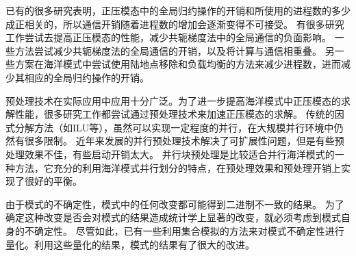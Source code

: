 已有的很多研究表明，正压模态中的全局归约操作的开销和所使用的进程数的多少成正相关的，所以通信开销随着进程数的增加会逐渐变得不可接受。
有很多研究工作尝试去提高正压模态的性能，减少共轭梯度法中的全局通信的负面影响。
一些方法尝试减少共轭梯度法的全局通信的开销，以及将计算与通信相重叠。 
另一些方案在海洋模式中尝试使用陆地点移除和负载均衡的方法来减少进程数，进而减少其相应的全局归约操作的开销。 

预处理技术在实际应用中应用十分广泛。为了进一步提高海洋模式中正压模态的求解性能，很多研究工作都尝试通过预处理技术来加速正压模态的求解。 
传统的因式分解方法（如ILU等），虽然可以实现一定程度的并行，在大规模并行环境中仍然有很多限制。
近年来发展的并行预处理技术解决了可扩展性问题，但是有些预处理效果不佳，有些启动开销太大。 
并行块预处理是比较适合并行海洋模式的一种方法，它充分的利用海洋模式并行划分的特点，在预处理效果和预处理开销上实现了很好的平衡。

由于模式的不确定性，模式中的任何改变都可能得到二进制不一致的结果。
为了确定这种改变是否会对模式的结果造成统计学上显著的改变，就必须考虑到模式自身的不确定性。
尽管如此，已有一些利用集合模拟的方法来对模式不确定性进行量化。利用这些量化的结果，模式的结果有了很大的改进。 

 



